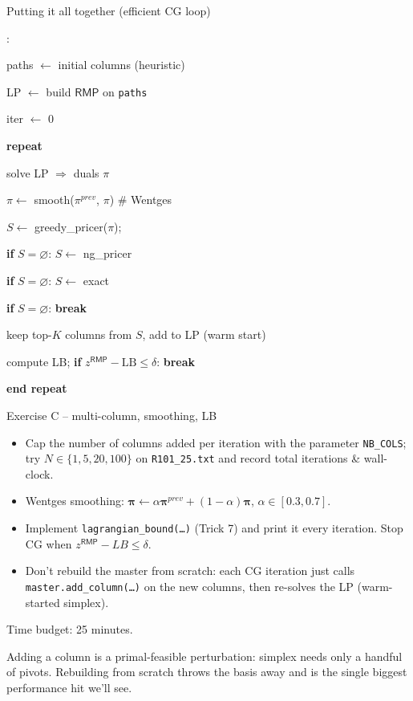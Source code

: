 \documentclass[10pt,aspectratio=169]{beamer}
\newcounter{algoline}
\newenvironment{algo}[1][Algorithm]{%
  \setcounter{algoline}{0}%
  \begin{tcolorbox}[colback=soft,colframe=accent2!70,sharp corners,
      boxrule=0.4pt,left=4pt,right=4pt,top=2pt,bottom=2pt,
      title=\textbf{#1}]%
  \ttfamily\small
  \begin{list}{\stepcounter{algoline}\textcolor{accent2}{\scriptsize\arabic{algoline}:}}%
    {\setlength{\leftmargin}{2.0em}\setlength{\itemsep}{0.1em}\setlength{\topsep}{0pt}}%
}{%
  \end{list}\end{tcolorbox}%
}
\newcommand{\Indent}{\hspace*{1.2em}}
\newcommand{\IndentTwo}{\hspace*{2.4em}}
\newcommand{\rmp}{\mathsf{RMP}}
\begin{document}
\begin{frame}{Putting it all together (efficient CG loop)}
\begin{algo}[Efficient column generation]
\item paths $\leftarrow$ initial columns (heuristic)
\item LP $\leftarrow$ build $\rmp$ on \texttt{paths}
\item iter $\leftarrow$ 0
\item \textbf{repeat}
\item \Indent solve LP $\Rightarrow$ duals $\pi$
\item \Indent $\pi \leftarrow$ smooth($\pi^{prev}$, $\pi$) \quad\textcolor{accent2}{\# Wentges}
\item \Indent $S \leftarrow$ greedy\_pricer($\pi$);
\item \IndentTwo \textbf{if} $S=\varnothing$: $S\leftarrow$ ng\_pricer
\item \IndentTwo \textbf{if} $S=\varnothing$: $S\leftarrow$ exact
\item \Indent \textbf{if} $S=\varnothing$: \textbf{break}
\item \Indent keep top-$K$ columns from $S$, add to LP (warm start)
\item \Indent compute LB; \textbf{if} $z^{\rmp}-\text{LB}\le\delta$: \textbf{break}
\item \textbf{end repeat}
\end{algo}
\end{frame}

\begin{frame}{Exercise C -- multi-column, smoothing, LB}
  \begin{exbox}
    \begin{itemize}\small
      \item Cap the number of columns added per iteration with the parameter
            \texttt{NB\_COLS}; try $N\!\in\!\{1,5,20,100\}$ on
            \texttt{R101\_25.txt} and record total iterations \& wall-clock.
      \item Wentges smoothing: $\boldsymbol\pi\!\leftarrow\!
            \alpha\boldsymbol\pi^{prev}\!+\!(1-\alpha)\boldsymbol\pi$,
            $\alpha\!\in\![0.3,0.7]$.
      \item Implement
            \texttt{lagrangian\_bound(\dots)} (Trick 7) and print it every
            iteration. Stop CG when $z^{\rmp}\!-\!LB\le\delta$.
      \item \alert{Don't rebuild the master from scratch}: each CG iteration
            just calls \texttt{master.add\_column(\dots)} on the new
            columns, then re-solves the LP (warm-started simplex).
    \end{itemize}
    \alert{Time budget: 25 minutes.}
  \end{exbox}
  \begin{keybox}
    Adding a column is a primal-feasible perturbation: simplex needs
    only a handful of pivots. Rebuilding from scratch throws the basis
    away and is the single biggest performance hit we'll see.
  \end{keybox}
\end{frame}
\end{document}

